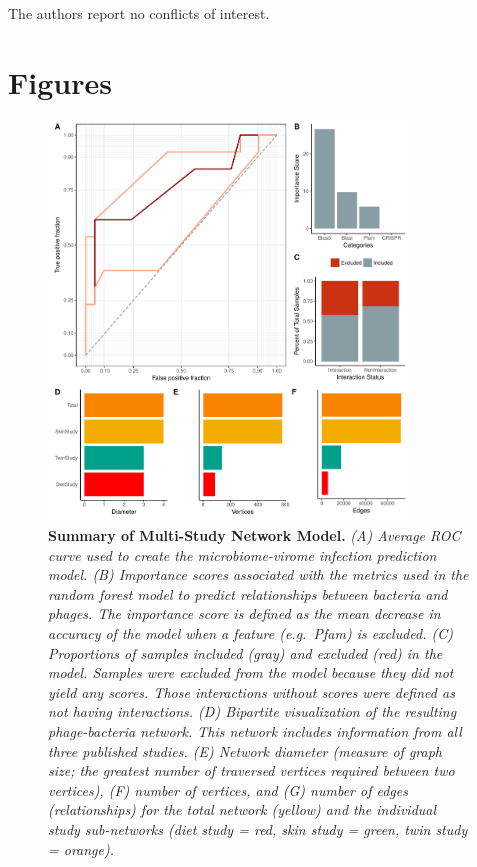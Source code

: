 \documentclass[12pt,]{article}
\begin{document}
The authors report no conflicts of interest.

\newpage

\section{Figures}\label{figures}

\begin{figure}[htbp]
\centering
\includegraphics[width=0.85000\textwidth]{../figures/rocCurves.pdf}
\caption{\textbf{Summary of Multi-Study Network Model.} \emph{(A)
Average ROC curve used to create the microbiome-virome infection
prediction model. (B) Importance scores associated with the metrics used
in the random forest model to predict relationships between bacteria and
phages. The importance score is defined as the mean decrease in accuracy
of the model when a feature (e.g.~Pfam) is excluded. (C) Proportions of
samples included (gray) and excluded (red) in the model. Samples were
excluded from the model because they did not yield any scores. Those
interactions without scores were defined as not having interactions. (D)
Bipartite visualization of the resulting phage-bacteria network. This
network includes information from all three published studies. (E)
Network diameter (measure of graph size; the greatest number of
traversed vertices required between two vertices), (F) number of
vertices, and (G) number of edges (relationships) for the total network
(yellow) and the individual study sub-networks (diet study = red, skin
study = green, twin study = orange).} \label{RocCurve}}
\end{figure}
\end{document}
